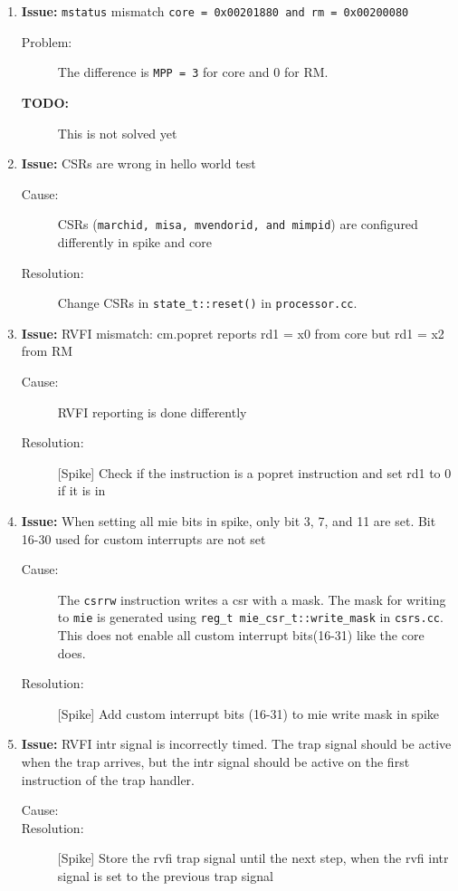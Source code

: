 \begin{enumerate}
\item \textbf{Issue:} \lstinline{mstatus} mismatch \lstinline{core = 0x00201880 and rm = 0x00200080}
  \begin{description}
    \item[Problem:] The difference is \lstinline{MPP = 3} for core and 0 for RM.
    \item[\textbf{TODO:}] This is not solved yet
  \end{description}
  
\item \textbf{Issue:} CSRs are wrong in hello world test
  \begin{description}
    \item[Cause:] CSRs (\lstinline{marchid, misa, mvendorid, and mimpid}) are configured differently in spike and core
    \item[Resolution:] Change CSRs in \lstinline{state_t::reset()} in \lstinline{processor.cc}.
  \end{description}
  
\item \textbf{Issue:} RVFI mismatch: cm.popret reports rd1 = x0 from core but rd1 = x2 from RM 
  \begin{description}
    \item[Cause:] RVFI reporting is done differently
    \item[Resolution:] [Spike] Check if the instruction is a popret instruction and set rd1 to 0 if it is in 
  \end{description}

\item \textbf{Issue:} When setting all mie bits in spike, only bit 3, 7, and 11 are set. Bit 16-30 used for custom interrupts are not set 
  \begin{description}
    \item[Cause:] The \lstinline{csrrw} instruction writes a csr with a mask. The mask for writing to \lstinline{mie} is generated using \lstinline{reg_t mie_csr_t::write_mask} in \lstinline{csrs.cc}. This does not enable all custom interrupt bits(16-31) like the core does.
    \item[Resolution:] [Spike] Add custom interrupt bits (16-31) to mie write mask in spike
  \end{description}
  

\item \textbf{Issue:} RVFI intr signal is incorrectly timed. The trap signal should be active when the trap arrives, but the intr signal should be active on the first instruction of the trap handler.
  \begin{description}
    \item[Cause:] 
    \item[Resolution:] [Spike] Store the rvfi trap signal until the next step, when the rvfi intr signal is set to the previous trap signal
  \end{description}


\end{enumerate}
